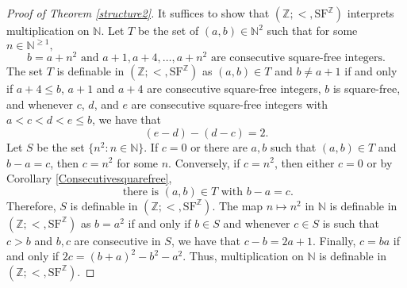 \documentclass[letterpaper]{amsart}
\newcommand{\nn}{\mathbb{N}}
\newcommand{\zz}{\mathbb{Z}}
\newcommand{\SF}{\mathrm{SF}^\zz}
\begin{document}
\begin{proof}[Proof of Theorem \ref{structure2}]
It suffices to show that $(\zz; <, \SF)$ interprets multiplication on $\nn$. 
Let $T$ be the set of $(a, b) \in \nn^2$ such that for some $n \in \nn^{\geq 1},$ 
$$ b= a+n^2 \text{ and } a+1, a+4, \ldots, a+n^2 \text{ are consecutive square-free integers}. $$
\noindent The set $T$ is definable in $(\zz; <, \SF)$ as $(a, b) \in T$ and $b\neq a+1$ if and only if  $a+4\leq b$, $a+1$ and $a+4$ are consecutive square-free integers, $b$ is square-free, and whenever $c$, $d$, and $e$ are consecutive square-free integers with $a< c <d< e \leq b$, we have that $$(e-d)-(d-c) =2.$$ Let $S$ be the set $\{ n^2 : n \in \nn\}$. If $c=0$ or there are $a, b$ such that $(a, b) \in T$ and $b-a =c$, then $c=n^2$ for some $n$. Conversely, if $c  =n^2$, then either $c=0$ or by Corollary \ref{Consecutivesquarefree}, 
$$ \text{ there is } (a,b) \in T \text{ with } b-a =c.$$ 
Therefore, $S$ is definable in  $(\zz; <, \SF)$. The map $n \mapsto n^2$ in $\nn$ is definable in $(\zz; <, \SF)$ as $b =a^2$ if and only if $b\in S$ and whenever $c\in S$ is such that $c>b$ and $b, c$ are consecutive in $S$, we have that $c-b = 2a+1$. Finally, $c =ba$ if and only if $2c= (b+a)^2-b^2-a^2$. Thus, multiplication on $\nn$ is definable in $(\zz; <, \SF)$.
\begin{comment}
We next prove that $\text{Th}(\zz; < ,\SF)$ is bi-interpretable with $\text{Th}(\nn; 0, 1, +, \times, <)$.  The structure $(\zz; <, \SF)$ is interpreted in an obvious way in  $(\nn; 0, 1, +, \times, <)$ by the map 
$$ \{(m, n) \in \nn^2 : m-n =k\}\mapsto k.$$ As a consequence,  $\text{Th}(\nn; 0, 1, +, \times, <)$ and $\text{Th}(\zz; < ,\SF)$ are mutually interpretable.  Let $I(\nn; 0, 1, <, +)$ be the copy of $(\nn; 0, 1, <, +)$ interpreted in $(\zz; <, \SF)$ obtained in the preceding paragraph and let $J(\zz; <, \SF)$ be the copy of $(\zz; <, \SF)$ interpreted in $(\nn; 0, 1, <, +)$ obtained above. Likewise, let 
$$I\circ J(\zz; <, \SF) \  \text{ and }\ J\circ I(\nn; 0, 1, <, +) $$  be the interpreted copy of $J(\zz; <, \SF)$ in $I(\nn; 0, 1, <, +)$ and the interpreted copy of $I(\nn; 0, 1, <, +)$ in $J(\zz; <, \SF)$ respectively. It is not hard to check that the obvious isomorphism from $(\nn; 0, 1, <, +)$ to $J\circ I(\nn; 0, 1, <, +)$ is $0$-definable in $(\nn; 0, 1, <, +)$ and the obvious isomorphism from $(\zz; <, \SF)$ to $I\circ J(\zz; <, \SF)$ is $0$-definable in $(\zz; <, \SF)$. The desired conclusion follows.
\end{comment}
\end{proof}
\end{document}
